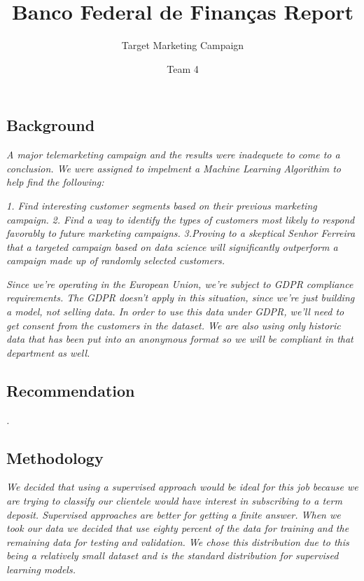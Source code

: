 \documentclass[
  letterpaper,
  DIV=11,
  numbers=noendperiod]{scrartcl}
\title{Banco Federal de Finanças Report}
\subtitle{Target Marketing Campaign}
\author{Team 4}
\date{}
\begin{document}
\maketitle
\ifdefined\Shaded\renewenvironment{Shaded}{\begin{tcolorbox}[interior hidden, enhanced, breakable, frame hidden, borderline west={3pt}{0pt}{shadecolor}, boxrule=0pt, sharp corners]}{\end{tcolorbox}}\fi

\hypertarget{background}{%
\subsection{Background}\label{background}}

\emph{A major telemarketing campaign and the results were inadequete to
come to a conclusion. We were assigned to impelment a Machine Learning
Algorithim to help find the following:}

\emph{1. Find interesting customer segments based on their previous
marketing campaign.} \emph{2. Find a way to identify the types of
customers most likely to respond favorably to future marketing
campaigns.} \emph{3.Proving to a skeptical Senhor Ferreira that a
targeted campaign based on data science will significantly outperform a
campaign made up of randomly selected customers.}

\emph{Since we're operating in the European Union, we're subject to GDPR
compliance requirements. The GDPR doesn't apply in this situation, since
we're just building a model, not selling data. In order to use this data
under GDPR, we'll need to get consent from the customers in the dataset.
We are also using only historic data that has been put into an anonymous
format so we will be compliant in that department as well.}

\hypertarget{recommendation}{%
\subsection{Recommendation}\label{recommendation}}

\emph{.}

\hypertarget{methodology}{%
\subsection{Methodology}\label{methodology}}

\emph{We decided that using a supervised approach would be ideal for
this job because we are trying to classify our clientele would have
interest in subscribing to a term deposit. Supervised approaches are
better for getting a finite answer. When we took our data we decided
that use eighty percent of the data for training and the remaining data
for testing and validation. We chose this distribution due to this being
a relatively small dataset and is the standard distribution for
supervised learning models.}
\end{document}

